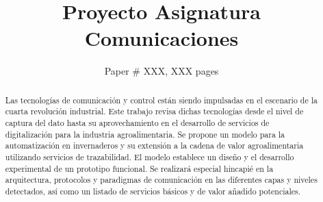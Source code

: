 \documentclass[sigconf]{acmart}
\begin{document}
\title{Proyecto Asignatura Comunicaciones}


\author{Paper \# XXX, XXX pages}

\renewcommand{\shortauthors}{X.et al.}

\begin{abstract}
Las tecnologías de comunicación y control están siendo impulsadas en el escenario de la cuarta revolución industrial. Este trabajo revisa dichas tecnologías desde el nivel de captura del dato  hasta su aprovechamiento en el desarrollo de servicios de digitalización para la industria agroalimentaria. Se propone un modelo para la automatización en invernaderos y su extensión a la cadena de valor agroalimentaria utilizando servicios de trazabilidad. El modelo establece un diseño y el desarrollo experimental de un prototipo funcional. Se realizará especial hincapié en la arquitectura, protocolos y paradigmas de comunicación en las diferentes capas y niveles detectados, así como un listado de servicios básicos y de valor añadido potenciales.

\end{abstract}

\maketitle





\end{document}
